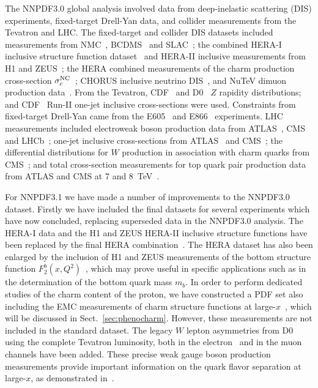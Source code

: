 The NNPDF3.0 global analysis involved data from deep-inelastic scattering (DIS) experiments, fixed-target Drell-Yan data, and
collider measurements from the Tevatron and LHC.
The fixed-target and collider DIS datasets included measurements from NMC~\cite{Arneodo:1996kd,Arneodo:1996qe}, 
BCDMS~\cite{bcdms1,bcdms2} and SLAC~\cite{Whitlow:1991uw}; the combined HERA-I 
inclusive structure function dataset~\cite{Aaron:2009aa} and HERA-II inclusive measurements
from H1 and ZEUS~\cite{Aaron:2012qi,Collaboration:2010ry,ZEUS:2012bx,Collaboration:2010xc};
the HERA combined measurements of the charm production cross-section $\sigma_{c}^{\rm NC}$~\cite{Abramowicz:1900rp};
CHORUS inclusive neutrino DIS~\cite{Onengut:2005kv}, and NuTeV dimuon production 
data~\cite{Goncharov:2001qe,MasonPhD}.
%
From the Tevatron, CDF~\cite{Aaltonen:2010zza} and D0~\cite{Abazov:2007jy} $Z$ rapidity distributions; and
CDF~\cite{Aaltonen:2008eq} Run-II one-jet inclusive cross-sections were used. Constraints from fixed-target Drell-Yan came from the 
E605~\cite{Moreno:1990sf} and E866~\cite{Webb:2003ps,Webb:2003bj,Towell:2001nh} experiments. 
%
LHC measurements included electroweak boson production data from ATLAS~\cite{Aad:2011dm,Aad:2013iua,Aad:2011fp}, 
CMS~\cite{Chatrchyan:2012xt,Chatrchyan:2013mza,Chatrchyan:2013tia} and LHCb~\cite{Aaij:2012vn,Aaij:2012mda};
one-jet inclusive cross-sections from ATLAS~\cite{Aad:2011fc,Aad:2013lpa} and CMS~\cite{Chatrchyan:2012bja};
the differential distributions for $W$ production in association with charm quarks from CMS~\cite{Chatrchyan:2013uja};
and total cross-section measurements for top quark pair production data from ATLAS and CMS at 7 and 8~TeV~\cite{ATLAS:2012aa,ATLAS:2011xha,TheATLAScollaboration:2013dja, Chatrchyan:2013faa,Chatrchyan:2012bra,Chatrchyan:2012ria}.

For NNPDF3.1 we have made a number of improvements to the NNPDF3.0
dataset. Firstly we  have included the final
datasets for several experiments which have now concluded, replacing superseded data in the NNPDF3.0 analysis.
%
The HERA-I data and the H1 and ZEUS HERA-II inclusive structure functions have been replaced by the final 
HERA combination~\cite{Abramowicz:2015mha}.
%
%
The HERA dataset has also been enlarged by the inclusion of H1 and ZEUS measurements of the 
bottom structure function $F_2^b(x,Q^2)$~\cite{Aaron:2009af,Abramowicz:2014zub}, which may prove useful in 
specific applications such as in the determination of the bottom quark mass $m_b$.
%
In order to perform dedicated studies of the charm content of the
proton, we have constructed a PDF set also 
including the EMC measurements of charm structure functions at
large-$x$~\cite{Aubert:1982tt}, which 
will be discussed in Sect.~\ref{sec:phenocharm}. However, these measurements are not included in the standard dataset.
%
The legacy $W$ lepton asymmetries from D0 using the complete Tevatron luminosity, both in the electron~\cite{D0:2014kma}
and in the muon~\cite{Abazov:2013rja} channels have been added.
%
These precise weak gauge boson production measurements provide important information on the quark flavor separation at large-$x$, 
as demonstrated in~\cite{Camarda:2015zba}.

